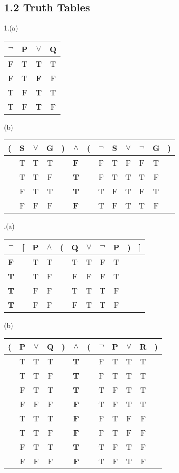 \documentclass{article}
\begin{document}
\subsection*{1.2 Truth Tables}
1.(a)
\linebreak
\begin{tabular}{cccc}
$\neg$&P&$\vee$&Q\\
\hline
F&T&\textbf{T}&T\\
F&T&\textbf{F}&F\\
T&F&\textbf{T}&T\\
T&F&\textbf{T}&F\\
\end{tabular}
\vspace{2em}
\linebreak
(b)
\linebreak
\begin{tabular}{ccccccccccccc}
(&S&$\vee$&G&)&$\wedge$&(&$\neg$&S&$\vee$&$\neg$&G&)\\
\hline
&T&T&T&&\textbf{F}&&F&T&F&F&T&\\
&T&T&F&&\textbf{T}&&F&T&T&T&F&\\
&F&T&T&&\textbf{T}&&T&F&T&F&T&\\
&F&F&F&&\textbf{F}&&T&F&T&T&F&\\
\end{tabular}
\vspace{2em}
.(a)
\linebreak
\begin{tabular}{ccccccccccc}
$\neg$&[&P&$\wedge$&(&Q&$\vee$&$\neg$&P&)&]\\
\hline
\textbf{F}&&T&T&&T&T&F&T&&\\
\textbf{T}&&T&F&&F&F&F&T&&\\
\textbf{T}&&F&F&&T&T&T&F&&\\
\textbf{T}&&F&F&&F&T&T&F&&\\
\end{tabular}
\vspace{2em}
\linebreak
(b)
\linebreak
\begin{tabular}{cccccccccccc}
(&P&$\vee$&Q&)&$\wedge$&(&$\neg$&P&$\vee$&R&)\\
\hline
&T&T&T&&\textbf{T}&&F&T&T&T&\\
&T&T&F&&\textbf{T}&&F&T&T&T&\\
&F&T&T&&\textbf{T}&&T&F&T&T&\\
&F&F&F&&\textbf{F}&&T&F&T&T&\\
&T&T&T&&\textbf{F}&&F&T&F&F&\\
&T&T&F&&\textbf{F}&&F&T&F&F&\\
&F&T&T&&\textbf{T}&&T&F&T&F&\\
&F&F&F&&\textbf{F}&&T&F&T&F&\\
\end{tabular}
\end{document}
